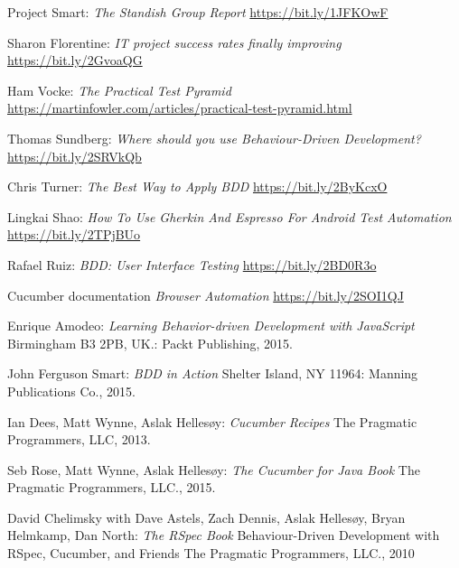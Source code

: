 \documentclass[conference]{IEEEtran}
\begin{document}
%
%
%
\begin{thebibliography}{1}
Project Smart: \emph{The Standish Group Report} \url{https://bit.ly/1JFKOwF}

Sharon Florentine: \emph{IT project success rates finally improving} \url{https://bit.ly/2GvoaQG}

Ham Vocke: \emph{The Practical Test Pyramid} \url{https://martinfowler.com/articles/practical-test-pyramid.html}

Thomas Sundberg: \emph{Where should you use Behaviour-Driven Development?} \url{https://bit.ly/2SRVkQb}

Chris Turner: \emph{The Best Way to Apply BDD} \url{https://bit.ly/2ByKcxO}

Lingkai Shao: \emph{How To Use Gherkin And Espresso For Android Test Automation} \url{https://bit.ly/2TPjBUo}

Rafael Ruiz: \emph{BDD: User Interface Testing} \url{https://bit.ly/2BD0R3o}

Cucumber documentation \emph{Browser Automation}
\url{https://bit.ly/2SOI1QJ}

Enrique Amodeo: \emph{Learning Behavior-driven Development with JavaScript} Birmingham B3 2PB, UK.: Packt Publishing, 2015.

John Ferguson Smart: \emph{BDD in Action} Shelter Island, NY 11964: Manning Publications Co., 2015.

Ian Dees, Matt Wynne, Aslak Hellesøy: \emph{Cucumber Recipes} The Pragmatic Programmers, LLC, 2013.

Seb Rose, Matt Wynne, Aslak Hellesøy: \emph{The Cucumber for Java Book} The Pragmatic Programmers, LLC., 2015.

David Chelimsky with Dave Astels, Zach Dennis, Aslak Hellesøy, Bryan Helmkamp, Dan North: \emph{The RSpec Book} Behaviour-Driven Development with RSpec, Cucumber, and Friends The Pragmatic Programmers, LLC., 2010


\end{thebibliography}
\end{document}
